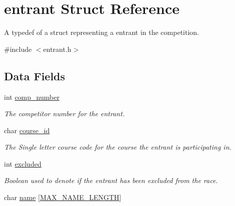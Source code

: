 \hypertarget{structentrant}{\section{entrant Struct Reference}
\label{structentrant}
}


A typedef of a struct representing a entrant in the competition.  




{\ttfamily \#include $<$entrant.\-h$>$}

\subsection*{Data Fields}
{\bf }\par
\begin{DoxyCompactItemize}
\item 
\hypertarget{structentrant_a255f1528ac4e76bea9dac1f10a360475}{int \hyperlink{structentrant_a255f1528ac4e76bea9dac1f10a360475}{comp\-\_\-number}}\label{structentrant_a255f1528ac4e76bea9dac1f10a360475}

\begin{DoxyCompactList}\small\item\em The competitor number for the entrant. \end{DoxyCompactList}\item 
\hypertarget{structentrant_afac79e4ab97ac6984e1c0b9ecfc641c8}{char \hyperlink{structentrant_afac79e4ab97ac6984e1c0b9ecfc641c8}{course\-\_\-id}}\label{structentrant_afac79e4ab97ac6984e1c0b9ecfc641c8}

\begin{DoxyCompactList}\small\item\em The Single letter course code for the course the entrant is participating in. \end{DoxyCompactList}\item 
\hypertarget{structentrant_aec9dc2d3c3a9bd117ca635d2acddf6e5}{int \hyperlink{structentrant_aec9dc2d3c3a9bd117ca635d2acddf6e5}{excluded}}\label{structentrant_aec9dc2d3c3a9bd117ca635d2acddf6e5}

\begin{DoxyCompactList}\small\item\em Boolean used to denote if the entrant has been excluded from the race. \end{DoxyCompactList}\item 
\hypertarget{structentrant_a997d236633398e9c4510d38d212d3fa2}{char \hyperlink{structentrant_a997d236633398e9c4510d38d212d3fa2}{name} \mbox{[}\hyperlink{entrant_8h_a0c397a708cec89c74029582574516b30}{M\-A\-X\-\_\-\-N\-A\-M\-E\-\_\-\-L\-E\-N\-G\-T\-H}\mbox{]}}\label{structentrant_a997d236633398e9c4510d38d212d3fa2}


\end{DoxyCompactItemize}
